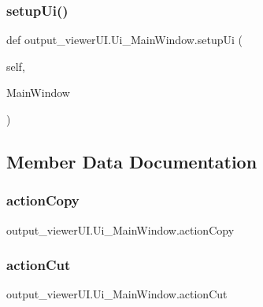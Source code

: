 \hypertarget{classoutput__viewer_u_i_1_1_ui___main_window_a2a9ce5c092ffe5a4e4cabb341be7ceb4}{}\label{classoutput__viewer_u_i_1_1_ui___main_window_a2a9ce5c092ffe5a4e4cabb341be7ceb4} 
\subsubsection{\texorpdfstring{setup\+Ui()}{setupUi()}}
{\footnotesize\ttfamily def output\+\_\+viewer\+U\+I.\+Ui\+\_\+\+Main\+Window.\+setup\+Ui (\begin{DoxyParamCaption}\item[{}]{self,  }\item[{}]{Main\+Window }\end{DoxyParamCaption})}



\subsection{Member Data Documentation}
\hypertarget{classoutput__viewer_u_i_1_1_ui___main_window_a591e47cae22ade3a6bd2a57754db9141}{}\label{classoutput__viewer_u_i_1_1_ui___main_window_a591e47cae22ade3a6bd2a57754db9141} 
\subsubsection{\texorpdfstring{action\+Copy}{actionCopy}}
{\footnotesize\ttfamily output\+\_\+viewer\+U\+I.\+Ui\+\_\+\+Main\+Window.\+action\+Copy}

\hypertarget{classoutput__viewer_u_i_1_1_ui___main_window_a20b08adb5b2b3e4f97465cfbdd5c4d27}{}\label{classoutput__viewer_u_i_1_1_ui___main_window_a20b08adb5b2b3e4f97465cfbdd5c4d27} 
\subsubsection{\texorpdfstring{action\+Cut}{actionCut}}
{\footnotesize\ttfamily output\+\_\+viewer\+U\+I.\+Ui\+\_\+\+Main\+Window.\+action\+Cut}

